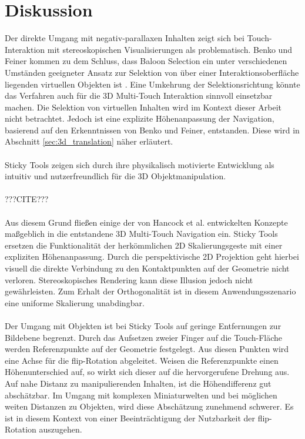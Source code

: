 \section{Diskussion}
\label{sec:diskussion_interaktion}

Der direkte Umgang mit negativ-parallaxen Inhalten zeigt sich bei Touch-Interaktion mit stereoskopischen Visualisierungen als problematisch. Benko und Feiner kommen zu dem Schluss, dass Baloon Selection ein unter verschiedenen Umständen geeigneter Ansatz zur Selektion von über einer Interaktionsoberfläche liegenden virtuellen Objekten ist \cite{benko:2007}. Eine Umkehrung der Selektionsrichtung könnte das Verfahren auch für die 3D Multi-Touch Interaktion sinnvoll einsetzbar machen. Die Selektion von virtuellen Inhalten wird im Kontext dieser Arbeit nicht betrachtet. Jedoch ist eine explizite Höhenanpassung der Navigation, basierend auf den Erkenntnissen von Benko und Feiner, entstanden. Diese wird in Abschnitt \ref{sec:3d_translation} näher erläutert.
\\\\
Sticky Tools zeigen sich durch ihre physikalisch motivierte Entwicklung als intuitiv und nutzerfreundlich für die 3D Objektmanipulation.
\\\\
???CITE???
\\\\
Aus diesem Grund fließen einige der von Hancock et al. entwickelten Konzepte maßgeblich in die entstandene 3D Multi-Touch Navigation ein. Sticky Tools ersetzen die Funktionalität der herkömmlichen 2D Skalierungsgeste mit einer expliziten Höhenanpassung. Durch die perspektivische 2D Projektion geht hierbei visuell die direkte Verbindung zu den Kontaktpunkten auf der Geometrie nicht verloren. Stereoskopisches Rendering kann diese Illusion jedoch nicht gewährleisten. Zum Erhalt der Orthogonalität ist in diesem Anwendungsszenario eine uniforme Skalierung unabdingbar. 
\\\\
Der Umgang mit Objekten ist bei Sticky Tools auf geringe Entfernungen zur Bildebene begrenzt. Durch das Aufsetzen zweier Finger auf die Touch-Fläche werden Referenzpunkte auf der Geometrie festgelegt. Aus diesen Punkten wird eine Achse für die flip-Rotation abgeleitet. Weisen die Referenzpunkte einen Höhenunterschied auf, so wirkt sich dieser auf die hervorgerufene Drehung aus. Auf nahe Distanz zu manipulierenden Inhalten, ist die Höhendifferenz gut abschätzbar. Im Umgang mit komplexen Miniaturwelten und bei möglichen weiten Distanzen zu Objekten, wird diese Abschätzung zunehmend schwerer. Es ist in diesem Kontext von einer Beeinträchtigung der Nutzbarkeit der flip-Rotation auszugehen.
